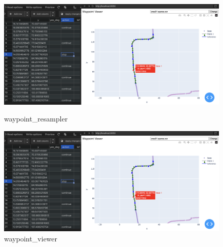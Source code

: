 \begin{figure}[h]
    \centering
    \begin{minipage}[b]{0.45\hsize}
       \centering
       \includegraphics[width=\linewidth]{fig/waypoint_viewer.png}
       \caption{waypoint\_resampler}
       \label{fig:robot}
    \end{minipage}
    \begin{minipage}[b]{0.45\hsize}
       \centering
       \includegraphics[width=\linewidth]{fig/waypoint_viewer.png}
       \caption{waypoint\_viewer}
       \label{fig:decomposition}
    \end{minipage}
\end{figure}